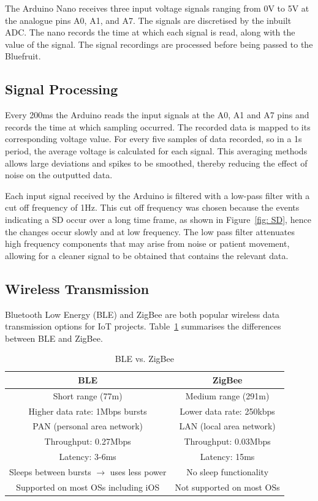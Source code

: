 The Arduino Nano receives three input voltage signals ranging from 0V to 5V at the analogue pins A0, A1, and A7. The signals are discretised by the inbuilt ADC. The nano records the time at which each signal is read, along with the value of the signal. The signal recordings are processed before being passed to the Bluefruit.





\subsection{Signal Processing}
Every 200ms the Arduino reads the input signals at the A0, A1 and A7 pins and records the time at which sampling occurred. The recorded data is mapped to its corresponding voltage value. For every five samples of data recorded, so in a 1s period, the average voltage is calculated for each signal. This averaging methods allows large deviations and spikes to be smoothed, thereby reducing the effect of noise on the outputted data.

Each input signal received by the Arduino is filtered with a low-pass filter with a cut off frequency of 1Hz. This cut off frequency was chosen because the events indicating a SD occur over a long time frame, as shown in Figure~\ref{fig: SD}, hence the changes occur slowly and at low frequency. The low pass filter attenuates high frequency components that may arise from noise or patient movement, allowing for a cleaner signal to be obtained that contains the relevant data.







\subsection{Wireless Transmission}
Bluetooth Low Energy (BLE) and ZigBee are both popular wireless data transmission options for IoT projects. Table~\ref{table:BLE vs ZigBee} summarises the differences between BLE and ZigBee.

\begin{table}[H]
\centering
\begin{tabular}{||c c||} 
 \hline
 BLE & ZigBee \\ [0.5ex] 
 \hline\hline
 Short range (77m) & Medium range (291m) \\
 Higher data rate: 1Mbps bursts & Lower data rate: 250kbps \\ 
 PAN (personal area network) & LAN (local area network) \\
 Throughput: 0.27Mbps & Throughput: 0.03Mbps \\
 Latency: 3-6ms & Latency: 15ms \\
 Sleeps between bursts $\rightarrow$ uses less power & No sleep functionality \\
 Supported on most OSs including iOS & Not supported on most OSs \\
 \hline
\end{tabular}
\caption{BLE vs. ZigBee \cite{Ray2015, Christiano}}
\label{table:BLE vs ZigBee}
\end{table}

